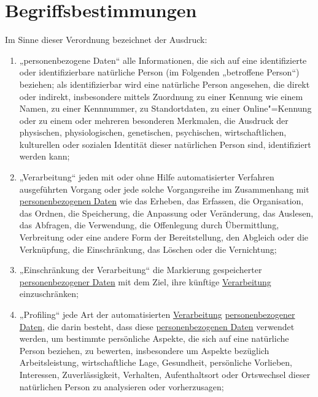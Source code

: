 \chapter{Begriffsbestimmungen}
\label{ch:4}

Im Sinne dieser Verordnung bezeichnet der Ausdruck:

\begin{enumerate}

  \item „personenbezogene Daten“ alle Informationen, die sich auf eine identifizierte oder identifizierbare natürliche
   Person (im Folgenden „betroffene Person“) beziehen; als identifizierbar wird eine natürliche Person angesehen, die
   direkt oder indirekt, insbesondere mittels Zuordnung zu einer Kennung wie einem Namen, zu einer Kennnummer, zu
   Standortdaten, zu einer Online"=Kennung oder zu einem oder mehreren besonderen Merkmalen, die Ausdruck der
   physischen, physiologischen, genetischen, psychischen, wirtschaftlichen, kulturellen oder sozialen Identität dieser
   natürlichen Person sind, identifiziert werden kann;%
  \label{itm:04-1}

  \item „Verarbeitung“ jeden mit oder ohne Hilfe automatisierter Verfahren ausgeführten Vorgang oder jede solche
   Vorgangsreihe im Zusammenhang mit \hyperref[itm:04-1]{personenbezogenen Daten} wie das Erheben, das Erfassen, die
   Organisation, das Ordnen, die Speicherung, die Anpassung oder Veränderung, das Auslesen, das Abfragen, die
   Verwendung, die Offenlegung durch Übermittlung, Verbreitung oder eine andere Form der Bereitstellung, den Abgleich
   oder die Verknüpfung, die Einschränkung, das Löschen oder die Vernichtung;%
  \label{itm:04-2}

  \item „Einschränkung der Verarbeitung“ die Markierung gespeicherter \hyperref[itm:04-1]{personenbezogener Daten} mit
   dem Ziel, ihre künftige \hyperref[itm:04-2]{Verarbeitung} einzuschränken;%
  \label{itm:04-3}

  \item „Profiling“ jede Art der automatisierten \hyperref[itm:04-2]{Verarbeitung} \hyperref[itm:04-1]
   {personenbezogener Daten}, die darin besteht, dass diese
   \hyperref[itm:04-1]{personenbezogenen Daten} verwendet werden, um bestimmte persönliche Aspekte, die sich auf eine
    natürliche Person beziehen, zu bewerten, insbesondere um Aspekte bezüglich Arbeitsleistung, wirtschaftliche Lage,
    Gesundheit, persönliche Vorlieben, Interessen, Zuverlässigkeit, Verhalten, Aufenthaltsort oder Ortswechsel dieser
    natürlichen Person zu analysieren oder vorherzusagen;%
  \label{itm:04-4}


\end{enumerate}
